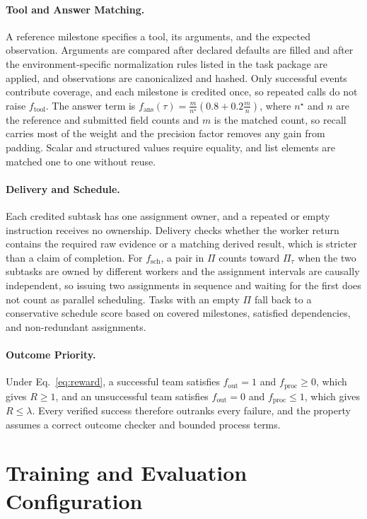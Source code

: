 \paragraph{Tool and Answer Matching.}
A reference milestone specifies a tool, its arguments, and the expected observation.
Arguments are compared after declared defaults are filled and after the environment-specific normalization rules listed in the task package are applied, and observations are canonicalized and hashed.
Only successful events contribute coverage, and each milestone is credited once, so repeated calls do not raise $f_{\mathrm{tool}}$.
The answer term is $f_{\mathrm{ans}}(\tau)=\tfrac{m}{n^{\star}}(0.8+0.2\tfrac{m}{n})$, where $n^{\star}$ and $n$ are the reference and submitted field counts and $m$ is the matched count, so recall carries most of the weight and the precision factor removes any gain from padding.
Scalar and structured values require equality, and list elements are matched one to one without reuse.

\paragraph{Delivery and Schedule.}
Each credited subtask has one assignment owner, and a repeated or empty instruction receives no ownership.
Delivery checks whether the worker return contains the required raw evidence or a matching derived result, which is stricter than a claim of completion.
For $f_{\mathrm{sch}}$, a pair in $\Pi$ counts toward $\Pi_\tau$ when the two subtasks are owned by different workers and the assignment intervals are causally independent, so issuing two assignments in sequence and waiting for the first does not count as parallel scheduling.
Tasks with an empty $\Pi$ fall back to a conservative schedule score based on covered milestones, satisfied dependencies, and non-redundant assignments.

\paragraph{Outcome Priority.}
Under Eq.~\ref{eq:reward}, a successful team satisfies $f_{\mathrm{out}}=1$ and $f_{\mathrm{proc}}\ge 0$, which gives $R\ge 1$, and an unsuccessful team satisfies $f_{\mathrm{out}}=0$ and $f_{\mathrm{proc}}\le 1$, which gives $R\le\lambda$.
Every verified success therefore outranks every failure, and the property assumes a correct outcome checker and bounded process terms.

\section{Training and Evaluation Configuration}
\label{app:training}

